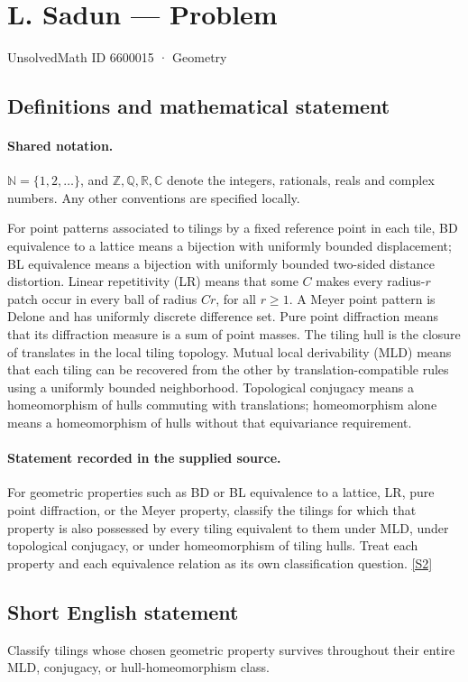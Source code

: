 \documentclass[11pt]{article}
\newcommand{\sref}[2]{\hyperlink{source:#1:#2}{[S#2]}}
\begin{document}
\setcounter{section}{6600014}
\section{L. Sadun — Problem}\label{6600015}
{\small\sffamily UnsolvedMath ID 6600015 · Geometry}
\subsection{Definitions and mathematical statement}

\paragraph{Shared notation.}$\mathbb N=\{1,2,\ldots\}$, and $\mathbb Z,\mathbb Q,\mathbb R,\mathbb C$ denote the integers, rationals, reals and complex numbers. Any other conventions are specified locally.


For point patterns associated to tilings by a fixed reference point in each tile, BD equivalence to a lattice means a bijection with uniformly bounded displacement; BL equivalence means a bijection with uniformly bounded two-sided distance distortion. Linear repetitivity (LR) means that some $C$ makes every radius-$r$ patch occur in every ball of radius $Cr$, for all $r\geq1$. A Meyer point pattern is Delone and has uniformly discrete difference set. Pure point diffraction means that its diffraction measure is a sum of point masses. The tiling hull is the closure of translates in the local tiling topology. Mutual local derivability (MLD) means that each tiling can be recovered from the other by translation-compatible rules using a uniformly bounded neighborhood. Topological conjugacy means a homeomorphism of hulls commuting with translations; homeomorphism alone means a homeomorphism of hulls without that equivariance requirement.
\paragraph{Statement recorded in the supplied source.}
For geometric properties such as BD or BL equivalence to a lattice, LR, pure point diffraction, or the Meyer property, classify the tilings for which that property is also possessed by every tiling equivalent to them under MLD, under topological conjugacy, or under homeomorphism of tiling hulls. Treat each property and each equivalence relation as its own classification question. \sref{6600015}{2}
\subsection{Short English statement}
Classify tilings whose chosen geometric property survives throughout their entire MLD, conjugacy, or hull-homeomorphism class.
\end{document}
